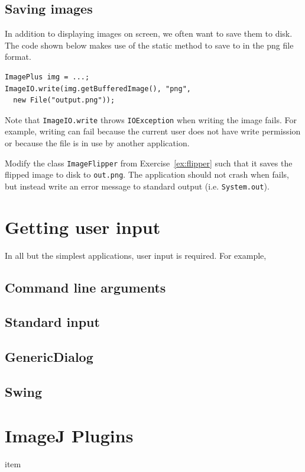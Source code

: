 \documentclass{book}
\begin{document}
\subsection{Saving images}
In addition to displaying images on screen, we often want to save them to disk. The code shown below makes use of the static method  to save  to  in the png file format.
\begin{lstlisting}
ImagePlus img = ...;
ImageIO.write(img.getBufferedImage(), "png", 
  new File("output.png"));
\end{lstlisting}
Note that \texttt{ImageIO.write} throws \texttt{IOException} when writing the image fails. For example, writing can fail because the current user does not have write permission or because the file is in use by another application.

\begin{exercise}
Modify the class \texttt{ImageFlipper} from Exercise~\ref{ex:flipper} such that it saves the flipped image to disk to \texttt{out.png}. The application should not crash when  fails, but instead write an error message to standard output (i.e.  \texttt{System.out}).
\end{exercise}

\section{Getting user input}
In all but the simplest applications, user input is required. For example, 

\subsection{Command line arguments}

\subsection{Standard input}

\subsection{GenericDialog}

\subsection{Swing}



\section{ImageJ Plugins}


\begin{exercise}
  item
\end{exercise}
\end{document}
